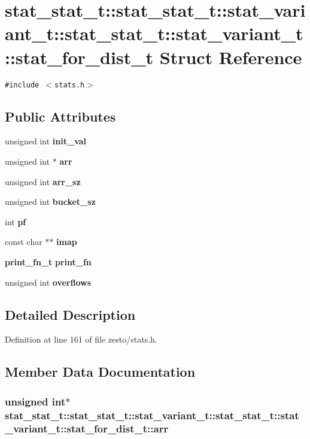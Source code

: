 \section{stat\_\-stat\_\-t::stat\_\-stat\_\-t::stat\_\-variant\_\-t::stat\_\-stat\_\-t::stat\_\-variant\_\-t::stat\_\-for\_\-dist\_\-t Struct Reference}
\label{structstat__stat__t_1_1stat__variant__t_1_1stat__for__dist__t}
{\tt \#include $<$stats.h$>$}

\subsection*{Public Attributes}
\begin{CompactItemize}
\item 
unsigned int {\bf init\_\-val}
\item 
unsigned int $\ast$ {\bf arr}
\item 
unsigned int {\bf arr\_\-sz}
\item 
unsigned int {\bf bucket\_\-sz}
\item 
int {\bf pf}
\item 
const char $\ast$$\ast$ {\bf imap}
\item 
{\bf print\_\-fn\_\-t} {\bf print\_\-fn}
\item 
unsigned int {\bf overflows}
\end{CompactItemize}


\subsection{Detailed Description}


Definition at line 161 of file zesto/stats.h.

\subsection{Member Data Documentation}
\subsubsection[{arr}]{\setlength{\rightskip}{0pt plus 5cm}unsigned int$\ast$ stat\_\-stat\_\-t::stat\_\-stat\_\-t::stat\_\-variant\_\-t::stat\_\-stat\_\-t::stat\_\-variant\_\-t::stat\_\-for\_\-dist\_\-t::arr}\label{structstat__stat__t_1_1stat__variant__t_1_1stat__for__dist__t_8106c05e3835d83d670004c91e00a91a}




